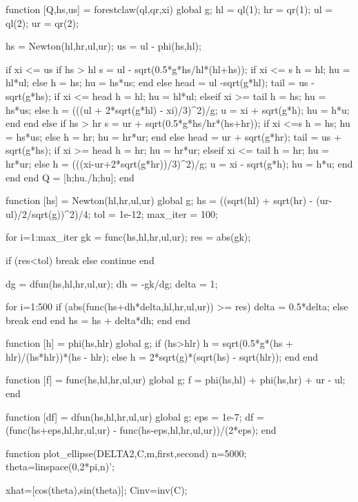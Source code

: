 \documentclass[12pt,a4paper]{article}
\begin{document}
	function [Q,hs,us] = forestclaw(ql,qr,xi)
	global g; 
	hl = ql(1); hr = qr(1);
	ul = ql(2); ur = qr(2);
	
	hs = Newton(hl,hr,ul,ur);  %
	us = ul - phi(hs,hl);
	
	if xi <= us
	if hs > hl
	s = ul - sqrt(0.5*g*hs/hl*(hl+hs));
	if xi <= s
	h = hl;
	hu = hl*ul;
	else
	h = hs;
	hu = hs*us;
	end
	else
	head = ul -sqrt(g*hl);
	tail = us - sqrt(g*hs);
	if xi <= head
	h = hl;
	hu = hl*ul;
	elseif xi >= tail
	h = hs;
	hu = hs*us;
	else
	h = (((ul + 2*sqrt(g*hl) - xi)/3)^2)/g;
	u = xi + sqrt(g*h);
	hu = h*u;
	end
	end
	else
	if hs > hr
	s = ur + sqrt(0.5*g*hs/hr*(hs+hr));
	if xi <=s
	h = hs;
	hu = hs*us;
	else
	h = hr;
	hu = hr*ur;
	end
	else
	head = ur + sqrt(g*hr);
	tail = us + sqrt(g*hs);
	if xi >= head
	h = hr;
	hu = hr*ur;
	elseif xi <= tail
	h = hr;
	hu = hr*ur;
	else
	h = (((xi-ur+2*sqrt(g*hr))/3)^2)/g;
	u = xi - sqrt(g*h);
	hu = h*u;
	end
	end
	end
	Q = [h;hu./h;hu];
	end
	
	function [hs] = Newton(hl,hr,ul,ur)
	global g;
	hs = ((sqrt(hl) + sqrt(hr) - (ur-ul)/2/sqrt(g))^2)/4;
	tol = 1e-12;
	max_iter = 100;
	
	for i=1:max_iter
	gk = func(hs,hl,hr,ul,ur);
	res = abs(gk);
	
	if (res<tol)
	break
	else
	continue
	end
	
	dg = dfun(hs,hl,hr,ul,ur);
	dh = -gk/dg;
	delta = 1;
	
	for i=1:500
	if (abs(func(hs+dh*delta,hl,hr,ul,ur)) >= res)
	delta = 0.5*delta;
	else
	break
	end
	end
	hs = hs + delta*dh;
	end
	end
	
	function [h] = phi(hs,hlr)
	global g; 
	if (hs>hlr)
	h = sqrt(0.5*g*(hs + hlr)/(hs*hlr))*(hs - hlr);
	else
	h = 2*sqrt(g)*(sqrt(hs) - sqrt(hlr));     
	end
	end
	
	function [f] = func(hs,hl,hr,ul,ur)
	global g; 
	f = phi(hs,hl) + phi(hs,hr) + ur - ul;
	end
	
	function [df] = dfun(hs,hl,hr,ul,ur)
	global g; 
	eps = 1e-7;
	df = (func(hs+eps,hl,hr,ul,ur) - func(hs-eps,hl,hr,ul,ur))/(2*eps);
	end
	
	
	function plot_ellipse(DELTA2,C,m,first,second)
	n=5000;
	theta=linspace(0,2*pi,n)';
	
	xhat=[cos(theta),sin(theta)];
	Cinv=inv(C);
	
\end{document}
